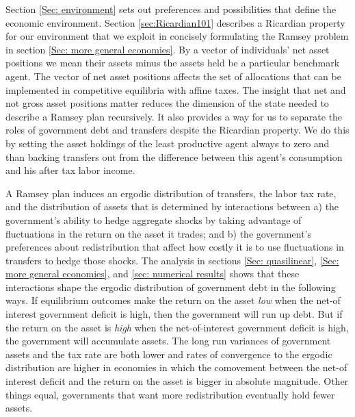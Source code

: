 \documentclass[thmsb,11pt]{article}
\begin{document}
%
%

Section \ref{Sec: environment} sets out  preferences and possibilities that define the economic environment.
Section \ref{sec:Ricardian101}
describes a  Ricardian property for our environment that we  exploit in concisely formulating the Ramsey problem
in section \ref{Sec: more general economies}. By a vector of individuals' net asset positions we mean  their assets minus 
the assets held be a particular benchmark agent. The vector of net asset positions  affects the set of allocations that can be implemented
in competitive equilibria with affine taxes.
The  insight that net and not gross asset positions matter reduces the dimension of the state needed 
to describe a Ramsey plan recursively. It also provides a way for us to separate the roles of  government debt and transfers despite
the Ricardian property.  We do this by setting the asset holdings of the least productive agent always  to  zero and than backing transfers 
out from the difference  between this agent's  consumption and  his after tax labor income. 



A Ramsey plan induces an ergodic distribution of transfers,   the labor tax rate, and the distribution of assets that is
  determined by interactions between
a) the government's  ability to hedge aggregate shocks by taking advantage of fluctuations in  the return on the asset it trades;
and b) the government's preferences about  redistribution that affect how costly it is to use fluctuations in transfers to hedge those shocks.
The analysis in sections \ref{Sec: quasilinear}, \ref{Sec: more general economies}, and \ref{sec: numerical results}
shows that these interactions  shape  the ergodic distribution of government debt in the following ways.
If equilibrium outcomes make the  return on the asset {\em low} when the net-of interest government deficit is high,
then the government will  run up  debt.  %
But if the return on the asset is {\em high} when the net-of-interest government deficit is high, the
 government will accumulate assets.
  The long run variances of government assets and the tax rate are both lower and  rates of convergence to the ergodic distribution are
higher in economies in which the comovement between the net-of interest deficit and  the return on  the asset is bigger in absolute magnitude.
 Other things equal, governments that want more redistribution eventually hold fewer assets.
\end{document}
